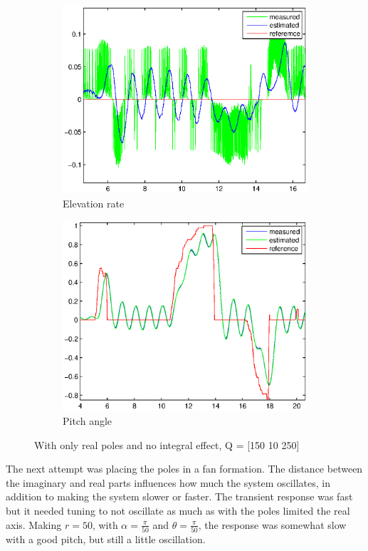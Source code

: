 \begin{figure}[H]
\graphicspath{ {Part4_pictures/}}
\begin{subfigure}{0.5\textwidth}
    \includegraphics[width=0.9\linewidth]{Part4_pictures/p4p2_noint/riktig_Q/elevationRate_PDreg_P3.eps} 
    \caption{Elevation rate}
    \label{fig:p4p2nointP6e}
\end{subfigure}
\begin{subfigure}{0.5\textwidth}
    \includegraphics[width=0.9\linewidth]{Part4_pictures/p4p2_noint/riktig_Q/pitch_PDreg_P3.eps}
    \caption{Pitch angle}
    \label{fig:p4p2nointP6p}
\end{subfigure}
\caption{With only real poles and no integral effect, Q = [150 10 250] }
\label{p4p2nointP6}
\end{figure}
The next attempt was placing the poles in a fan formation. The distance between the imaginary and real parts influences how much the system oscillates, in addition to making the system slower or faster. The transient response was fast but it needed tuning to not oscillate as much as with the poles limited the real axis. Making $r = 50$, with $\alpha = \frac{\pi}{50}$ and $\theta = \frac{\pi}{50}$, the response was somewhat slow with a good pitch, but still a little oscillation. 

